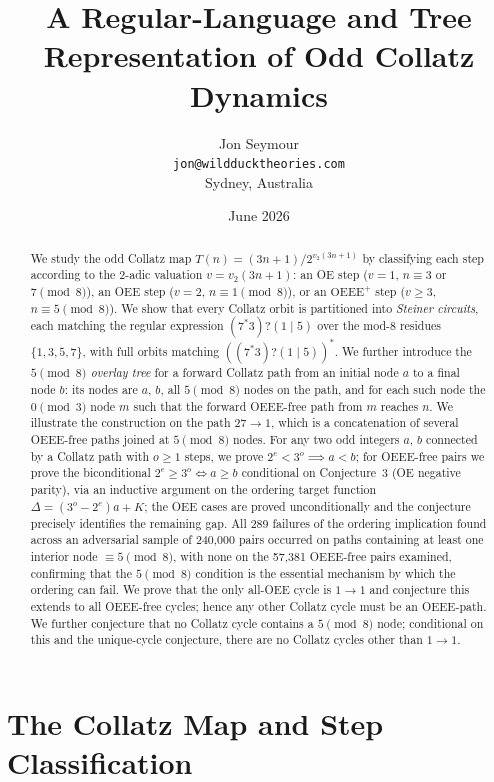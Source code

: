 \documentclass[11pt]{article}
\title{A Regular-Language and Tree Representation of Odd Collatz Dynamics}
\author{Jon Seymour\\
  \small\texttt{jon@wildducktheories.com}\\
  \small Sydney, Australia}
\date{June 2026}
\begin{document}
\maketitle

\begin{abstract}
We study the odd Collatz map $T(n) = (3n+1)/2^{v_2(3n+1)}$ by classifying
each step according to the 2-adic valuation $v = v_2(3n+1)$: an OE step
($v=1$, $n\equiv 3$ or $7\pmod{8}$), an OEE step ($v=2$, $n\equiv
1\pmod{8}$), or an $\mathrm{OEEE}^+$ step ($v\geq 3$, $n\equiv 5\pmod{8}$).
We show that every Collatz orbit is partitioned into \emph{Steiner circuits},
each matching the regular expression $(7^*3)?(1\mid 5)$ over the mod-8
residues $\{1,3,5,7\}$, with full orbits matching $((7^*3)?(1\mid 5))^*$.
We further introduce the \emph{$5\pmod{8}$ overlay tree} for a forward
Collatz path from an initial node $a$ to a final node $b$: its nodes are
$a$, $b$, all $5\pmod{8}$ nodes on the path, and for each such node the
$0\pmod{3}$ node $m$ such that the forward OEEE-free path from $m$ reaches $n$.
We illustrate the construction on the path $27\to 1$, which is a
concatenation of several OEEE-free paths joined at $5\pmod{8}$ nodes.
For any two odd integers $a$, $b$ connected by a Collatz path with $o\geq 1$
steps, we prove $2^e < 3^o \implies a < b$; for OEEE-free pairs we prove
the biconditional $2^e \geq 3^o \iff a \geq b$ conditional on
Conjecture~3 (OE negative parity), via an inductive argument on the ordering
target function $\Delta = (3^o - 2^e)a + K$; the OEE cases are proved
unconditionally and the conjecture precisely identifies the remaining gap.  All 289 failures of the ordering implication found across
an adversarial sample of 240{,}000 pairs occurred on paths containing at least
one interior node $\equiv 5\pmod{8}$, with none on the 57{,}381 OEEE-free pairs
examined, confirming that the $5\pmod{8}$ condition is the essential mechanism
by which the ordering can fail.  We prove that the only all-OEE cycle is $1\to 1$ and conjecture
this extends to all OEEE-free cycles; hence any other Collatz cycle must be an
OEEE-path.  We further conjecture that no Collatz cycle contains a $5\pmod{8}$
node; conditional on this and the unique-cycle conjecture, there are no Collatz
cycles other than $1\to 1$.
\end{abstract}

\section{The Collatz Map and Step Classification}
\end{document}

